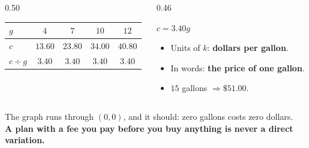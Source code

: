 \documentclass[aspectratio=169, 11pt]{beamer}
\begin{document}
\begin{frame}[t, plain]
  \begin{columns}[T]
    \begin{column}{0.50\textwidth}
      \centering
      \renewcommand{\arraystretch}{1.35}
      \begin{tabular}{|l|c|c|c|c|}
      \hline
      $g$ & $4$ & $7$ & $10$ & $12$ \\ \hline
      $c$ & $13.60$ & $23.80$ & $34.00$ & $40.80$ \\ \hline
      $c\div g$ & $3.40$ & $3.40$ & $3.40$ & $3.40$ \\ \hline
      \end{tabular}
    \end{column}
    \begin{column}{0.46\textwidth}
      \begin{block}{$c=3.40g$}
        \begin{itemize}\setlength{\itemsep}{3pt}
          \item Units of $k$: \textbf{dollars per gallon}.
          \item In words: \textbf{the price of one gallon}.
          \item $15$ gallons $\Rightarrow \$51.00$.
        \end{itemize}
      \end{block}
    \end{column}
  \end{columns}
  \vspace{6pt}
  \begin{block}{}
    \centering The graph runs through $(0,0)$, and it should: zero gallons costs zero dollars. \\[2pt]
    \textbf{A plan with a fee you pay before you buy anything is never a direct variation.}
  \end{block}
\end{frame}
\end{document}
